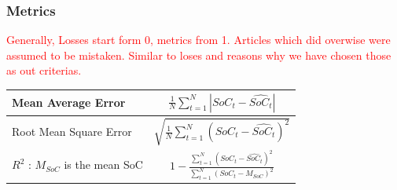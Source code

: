 \subsubsection{Metrics}
\textcolor{red}{Generally, Losses start form 0, metrics from 1. Articles which did overwise were assumed to be mistaken.}
\textcolor{red}{Similar to loses and reasons why we have chosen those as out criterias.} \\
\begin{tabular}{l c}
    \hline
    Mean Average Error &  $\frac{1}{N}\sum\limits^N_{t=1} |SoC_t-\hat{SoC_t}|$ \\
    \hline
    Root Mean Square Error & $ \sqrt{\frac{1}{N}\sum\limits^N_{t=1} \left(SoC_t-\hat{SoC_t} \right)^2}$ \\
    \hline
    $R^2$ : $M_{SoC}$ is the mean SoC & $1-\frac{\sum\limits^N_{t=1}(SoC_t-\hat{SoC_t})^2}
              {\sum\limits^N_{t=1}(SoC_t-M_{SoC})^2}$ \\
\end{tabular}
\\

